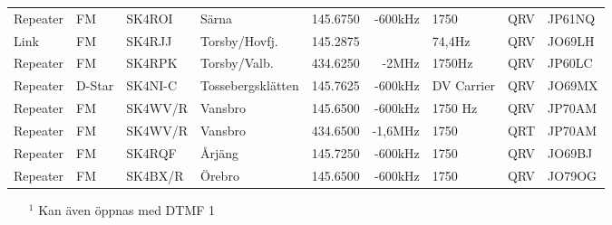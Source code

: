 \begin{landscape}
\begin{longtable}{llllrrlcl}
	Repeater          & FM           & SK4ROI        & Särna               &          145.6750 &        -600kHz & 1750            &       QRV       & JP61NQ           \\
	Link              & FM           & SK4RJJ        & Torsby/Hovfj.       &          145.2875 &                & 74,4Hz          &       QRV       & JO69LH           \\
	Repeater          & FM           & SK4RPK        & Torsby/Valb.        &          434.6250 &          -2MHz & 1750Hz          &       QRV       & JP60LC           \\
	Repeater          & D-Star       & SK4NI-C       & Tossebergsklätten   &          145.7625 &        -600kHz & DV Carrier      &       QRV       & JO69MX           \\
	Repeater          & FM           & SK4WV/R       & Vansbro             &          145.6500 &        -600kHz & 1750 Hz         &       QRV       & JP70AM           \\
	Repeater          & FM           & SK4WV/R       & Vansbro             &          434.6500 &        -1,6MHz & 1750            &       QRT       & JP70AM           \\
	Repeater          & FM           & SK4RQF        & Årjäng              &          145.7250 &        -600kHz & 1750            &       QRV       & JO69BJ           \\
	Repeater          & FM           & SK4BX/R       & Örebro              &          145.6500 &        -600kHz & 1750            &       QRV       & JO79OG
\end{longtable}
\begin{itemize}
\item[$^1$] Kan även öppnas med DTMF 1
\end{itemize}

\end{landscape}
